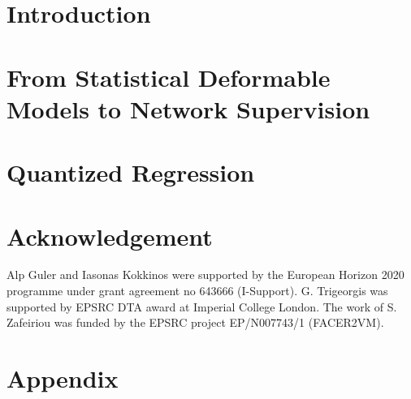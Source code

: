 \section{Introduction}
\label{sec:introduction}


\section{From Statistical Deformable Models to Network Supervision}\label{sec:SDMs}


\section{Quantized Regression}\label{sec:quantized}








\section*{Acknowledgement}
Alp Guler and Iasonas Kokkinos were supported by the European Horizon 2020 programme under grant agreement no 643666 (I-Support). G. Trigeorgis was supported by EPSRC DTA award at Imperial College London.  The work of S. Zafeiriou was funded by the EPSRC project EP/N007743/1 (FACER2VM).



\section*{Appendix}
\appendix




